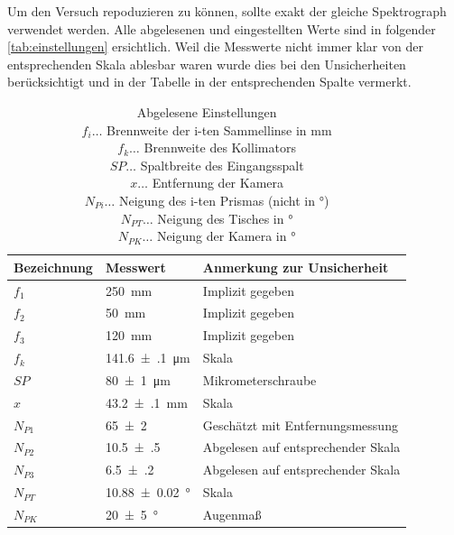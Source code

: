 \documentclass[12pt,english,ngerman]{scrartcl}
\begin{document}
Um den Versuch repoduzieren zu können, sollte exakt der gleiche Spektrograph
verwendet werden. Alle abgelesenen und eingestellten Werte sind in folgender
\autoref{tab:einstellungen} ersichtlich. Weil die Messwerte nicht immer klar
von der entsprechenden Skala ablesbar waren wurde dies bei den Unsicherheiten
berücksichtigt und in der Tabelle in der entsprechenden Spalte vermerkt.

\begin{table}[H]
	\caption[Abgelesene Einstellungen]{Abgelesene Einstellungen                              \\
		$f_i \dots$ Brennweite der i-ten Sammellinse in mm    \\
		$f_k \dots$ Brennweite des Kollimators                \\
		$SP \dots$ Spaltbreite des Eingangsspalt              \\
		$x \dots$ Entfernung der Kamera                       \\
		$N_{Pi} \dots$ Neigung des i-ten Prismas (nicht in °) \\
		$N_{PT} \dots$ Neigung des Tisches in °               \\
		$N_{PK} \dots$ Neigung der Kamera in °
	}
	\begin{tabular}{|l|l|l|}
		\hline
		\textbf{Bezeichnung} & \textbf{Messwert}       & \textbf{Anmerkung zur Unsicherheit} \\ \hline
		$f_1$                & \SI{250}{\mm}           & Implizit gegeben                    \\ \hline
		$f_2$                & \SI{50}{\mm}            & Implizit gegeben                    \\ \hline
		$f_3$                & \SI{120}{\mm}           & Implizit gegeben                    \\ \hline
		$f_k$                & \SI{141.6(1)}{\micro\m} & Skala                               \\ \hline
		$SP$                 & \SI{80(1)}{\micro\m}    & Mikrometerschraube                  \\ \hline
		$x$                  & \SI{43.2(1)}{\mm}       & Skala                               \\ \hline
		$N_{P1}$             & \SI{65(2)}{}            & Geschätzt mit Entfernungsmessung    \\ \hline
		$N_{P2}$             & \SI{10.5(5)}{}          & Abgelesen auf entsprechender Skala  \\ \hline
		$N_{P3}$             & \SI{6.5(2)}{}           & Abgelesen auf entsprechender Skala  \\ \hline
		$N_{PT}$             & \SI{10.88(2)}{\degree}  & Skala                               \\ \hline
		$N_{PK}$             & \SI{20(5)}{\degree}     & Augenmaß                            \\ \hline
	\end{tabular}\label{tab:einstellungen}
\end{table}
\end{document}
